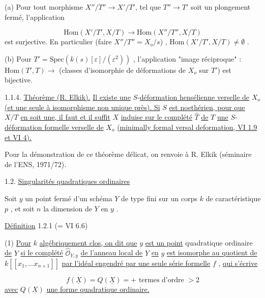 (a)  Pour tout morphisme $X''/T'' \longrightarrow X'/T'$, tel que $T'' \to T'$ soit un plongement fermé, l'application

\begin{equation*}
\mathrm{Hom}(X'/T' , X/T) \longrightarrow \mathrm{Hom}(X''/T'' , X/T)
\end{equation*}
est surjective. En particulier (faire $X''/T'' = X_o/s$) , $\mathrm{Hom}(X'/T', X/T) \neq \emptyset$ .

(b)  Pour $T' = \mathrm{Spec}(k(s)[\varepsilon]/(\varepsilon^2))$ , l'application "image réciproque" : $\mathrm{Hom}(T',T) \to$ (classes d'isomorphie de déformations de $X_o$ sur $T'$) est bijective.



1.1.4. \underline{Théorème (R. Elkik).} \underline{Il existe une} $S$-\underline{déformation hensélienne verselle de} $X_o$ \underline{(et une seule à isomorphisme non unique près). Si} $S$ \underline{est noethérien, pour que} $X/T$ \underline{en soit une, il faut et il suffit} $X$ \underline{induise sur le complété} $\widehat{T}$ \underline{de} $T$ \underline{une} $S$-\underline{déformation formelle verselle de} $X_o$ \underline{(minimally formal versal deformation, VI 1.9 et VI 4).}

Pour la démonstration de ce théorème délicat, on renvoie à R. Elkik (séminaire de l'ENS, 1971/72).


1.2. \underline{Singularités quadratiques ordinaires}

Soit $y$ un point fermé d'un schéma $Y$ de type fini sur un corps $k$ de caractéristique $p$ , et soit $n$ la dimension de $Y$ en $y$ .


\underline{Définition} 1.2.1 (= VI 6.6)

(1) \underline{Pour} $k$ \underline{algébriquement clos, on dit que} $y$ \underline{est un point} quadratique ordinaire \underline{de} $Y$ \underline{si le complété} $\widehat{\mathcal{O}}_{Y,y}$ \underline{de l'anneau local de} $Y$ \underline{en} $y$ \underline{est isomorphe au quotient de} $k[[x_1,\ldots x_{n+1}]]$ \underline{par l'idéal engendré par une seule série formelle} $f$ , \underline{qui s'écrive}

\begin{equation}\tag{4.2.1}
f(\underline{X}) = Q(\underline{X}) = + \mbox{ termes d'ordre } > 2
\end{equation}
\underline{avec} $Q(\underline{X})$ \underline{une forme quadratique ordinaire.}

